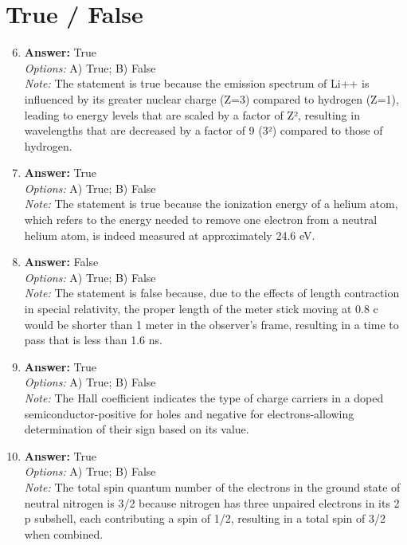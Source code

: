 \documentclass[12pt]{article}
\begin{document}
\section*{True / False}
\begin{enumerate}[label=\arabic*.]
\setcounter{enumi}{5}
\item \textbf{Answer:} True
\\ \textit{Options:} A) True; B) False
\\ \textit{Note:} The statement is true because the emission spectrum of Li++ is influenced by its greater nuclear charge (Z=3) compared to hydrogen (Z=1), leading to energy levels that are scaled by a factor of Z², resulting in wavelengths that are decreased by a factor of 9 (3²) compared to those of hydrogen.
\item \textbf{Answer:} True
\\ \textit{Options:} A) True; B) False
\\ \textit{Note:} The statement is true because the ionization energy of a helium atom, which refers to the energy needed to remove one electron from a neutral helium atom, is indeed measured at approximately 24.6 eV.
\item \textbf{Answer:} False
\\ \textit{Options:} A) True; B) False
\\ \textit{Note:} The statement is false because, due to the effects of length contraction in special relativity, the proper length of the meter stick moving at 0.8 c would be shorter than 1 meter in the observer's frame, resulting in a time to pass that is less than 1.6 ns.
\item \textbf{Answer:} True
\\ \textit{Options:} A) True; B) False
\\ \textit{Note:} The Hall coefficient indicates the type of charge carriers in a doped semiconductor-positive for holes and negative for electrons-allowing determination of their sign based on its value.
\item \textbf{Answer:} True
\\ \textit{Options:} A) True; B) False
\\ \textit{Note:} The total spin quantum number of the electrons in the ground state of neutral nitrogen is 3/2 because nitrogen has three unpaired electrons in its 2 p subshell, each contributing a spin of 1/2, resulting in a total spin of 3/2 when combined.
\end{enumerate}
\end{document}
